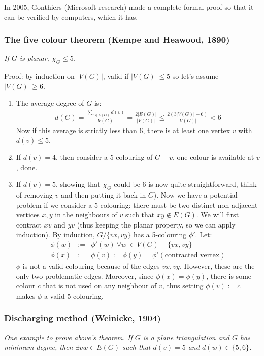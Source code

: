 \documentclass[11pt]{book}
\begin{document}
		In 2005, Gonthiers (Microsoft research) made a complete formal proof so that it can be verified by computers, which it has.
		
		\subsubsection{The five colour theorem (Kempe and Heawood, 1890)}
		\textit{If $G$ is planar, $\chi_{G} \leq 5$.\\}
		
		Proof: by induction on $|V(G)|$, valid if $|V(G)| \leq 5$ so let's assume $|V(G)| \geq 6$. 
		\begin{enumerate}
			\item The average degree of $G$ is:
				\begin{eqnarray}
					d(G) = \frac{\sum_{v \in V(G)} d(v)}{|V(G)|} = \frac{2 |E(G)|}{|V(G)|} \leq \frac{2 (3|V(G)| - 6)}{|V(G)|} < 6
				\end{eqnarray}
				Now if this average is strictly less than 6, there is at least one vertex $v$ with $d(v) \leq 5$.
			\item If $d(v) = 4$, then consider a 5-colouring of $G-v$, one colour is available at $v$, done.
			\item If $d(v) = 5$, showing that $\chi_{G}$ could be 6 is now quite straightforward, think of removing $v$ and then putting it back in $G$). Now we have a potential problem if we consider a 5-colouring: there must be two distinct non-adjacent vertices $x, y$ in the neighbours of $v$ such that $xy \notin E(G)$. We will first contract $xv$ and $yv$ (thus keeping the planar property, so we can apply induction). By induction, $G / \{ vx, vy \}$ has a 5-colouring $\phi'$. Let:
				\begin{eqnarray}
					\phi(w) &:=& \phi'(w) ~\forall w\ \in V(G) - \{ vx, vy \}\\
					\phi(x) &:=& \phi(v) := \phi(y) = \phi'(\text{contracted vertex})
				\end{eqnarray}
				$\phi$ is not a valid colouring because of the edges $vx, vy$. However, these are the only two problematic edges. Moreover, since $\phi(x) = \phi(y)$, there is some colour $c$ that is not used on any neighbour of $v$, thus setting $\phi(v) := c$ makes $\phi$ a valid 5-colouring.
		\end{enumerate}
		
		
		\subsubsection{Discharging method (Weinicke, 1904)}
		\textit{One example to prove above's theorem. If $G$ is a plane triangulation and $G$ has minimum degree, then $\exists vw \in E(G)$ such that $d(v) = 5$ and $d(w) \in \{ 5, 6 \}$.\\}
		
\end{document}
